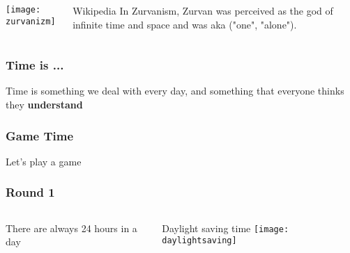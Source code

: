 \documentclass[aspectratio=169, 15pt,usenames,dvipsnames]{beamer}
\begin{document}
{\begin{gdblank}
\begin{columns}
\begin{column}{0.5\textwidth}
				\centering\texttt{[image: zurvanizm]} 
			\end{column}
			\begin{column}{0.5\textwidth}
				\begin{block}{Wikipedia}
					In Zurvanism, Zurvan was perceived as the god of infinite time and space and was aka ("one", "alone").
				\end{block} 
			\end{column}
		\end{columns}     
	\end{gdblank}
	\begin{gdblank}
		\frametitle{Time is ...}
		\LARGE\centering Time is something we deal with every day, and something that everyone thinks they 
		\bf understand
	\end{gdblank} 
	\begin{gdblank}
		\frametitle{Game Time}
		\Huge\centering Let's play a game
	\end{gdblank} 
	\begin{gdblank}
		\frametitle{Round 1}    
		\begin{columns}
			\begin{column}{0.70\textwidth}
				\centering
				\LARGE There are always 24 hours in a day 
				\pause     
			\end{column}
			\begin{column}{0.3\textwidth}
				\large\centering Daylight saving time 
				\vskip0.5cm
				\texttt{[image: daylightsaving]}
			\end{column}
		\end{columns}
	\end{gdblank} 
	
}
\end{document}
